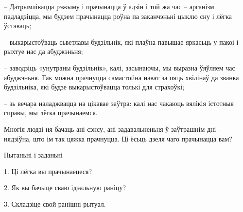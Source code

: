 – Датрымлівацца рэжыму і прачынацца ў адзін і той жа час – арганізм падладзіцца, мы будзем прачынацца роўна па заканчэньні цыклю сну і лёгка ўставаць;

– выкарыстоўваць сьветлавы будзільнік, які плаўна павышае яркасьць у пакоі і рыхтуе нас да абуджэньня;

– заводзіць «унутраны будзільнік», калі, засынаючы, мы выразна ўяўляем час абуджэньня. Так можна прачнуцца самастойна нават за пяць хвілінаў да званка будзільніка, які будзе выкарыстоўвацца толькі для страхоўкі;

– зь вечара наладжвацца на цікавае заўтра: калі нас чакаюць вялікія істотныя справы, мы лёгка прачынаемся.

Многія людзі ня бачаць ані сэнсу, ані задавальненьня ў заўтрашнім дні – нядзіўна, што ім так цяжка прачнуцца. Ці ёсьць дзеля чаго прачынацца вам?

Пытаньні і заданьні

1. Ці лёгка вы прачынаецеся?

2. Як вы бачыце сваю ідэальную раніцу?

3. Складзіце свой ранішні рытуал.

